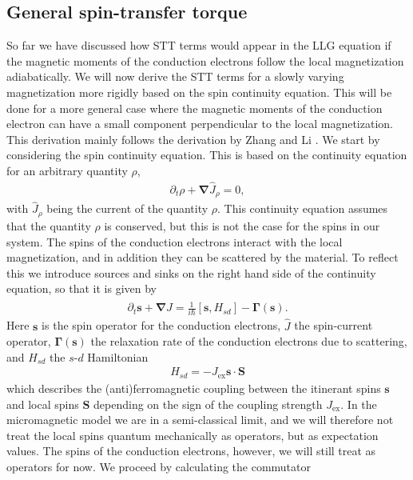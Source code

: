 \subsection{General spin-transfer torque} \label{sec:GeneralSTT}
So far we have discussed how STT terms would appear in the LLG equation if the magnetic moments of the conduction electrons follow the local magnetization adiabatically. We will now derive the STT terms for a slowly varying magnetization more rigidly based on the spin continuity equation. This will be done for a more general case where the magnetic moments of the conduction electron can have a small component perpendicular to the local magnetization. This derivation mainly follows the derivation by Zhang and Li \cite{ZhangLi-04}. We start by considering the spin continuity equation. This is based on the continuity equation for an arbitrary quantity $\rho$,
\begin{align}
\partial_t\rho + \mathbold{\nabla}\hat{J}_{\rho} = 0,
\end{align}
with $\hat{J}_{\rho}$ being the current of the quantity $\rho$. This continuity equation assumes that the quantity $\rho$ is conserved, but this is not the case for the spins in our system. The spins of the conduction electrons interact with the local magnetization, and in addition they can be scattered by the material. To reflect this we introduce sources and sinks on the right hand side of the continuity equation, so that it is given by
\begin{align}
\partial_t\mathbold{s} + \mathbold{\nabla}\hat{J} = \frac{1}{i\hbar} \left[\mathbold{s}, H_{sd}\right] - \mathbold{\Gamma}(\mathbold{s}).
\end{align}
Here $\mathbold{s}$ is the spin operator for the conduction electrons, $\hat{J}$ the spin-current operator, $\mathbold{\Gamma}(\mathbold{s})$ the relaxation rate of the conduction electrons due to scattering, and $H_{sd}$ the $s$-$d$ Hamiltonian
\begin{align}
H_{sd} = -J_{\textrm{ex}}\mathbold{s}\cdot\mathbold{S}
\end{align}
which describes the (anti)ferromagnetic coupling between the itinerant spins $\mathbold{s}$ and local spins $\mathbold{S}$ depending on the sign of the coupling strength $J_{\textrm{ex}}$. In the micromagnetic model we are in a semi-classical limit, and we will therefore not treat the local spins quantum mechanically as operators, but as expectation values. The spins of the conduction electrons, however, we will still treat as operators for now. We proceed by calculating the commutator

